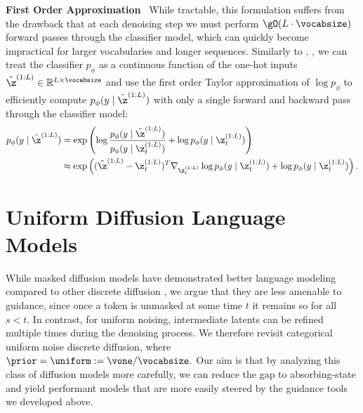 \documentclass{article} %
\begin{document}
\textbf{First Order Approximation}~
While tractable, this formulation suffers from the drawback that at each denoising step we must perform $\gO(L\cdot \vocabsize)$ forward passes through the classifier model, which can quickly become impractical for larger vocabularies and longer sequences.
Similarly to \citet{grathwohl2021oops}, \citet{vignac2022digress}, 
we can treat the classifier $p_\phi$ as a continuous function of the one-hot inputs $\tilde{\z}^{(1:L)} \in \mathbb{R}^{L \times \vocabsize}$ and use the first order Taylor approximation of $\log p_\phi$ to efficiently compute $p_{\phi}(y \mid \tilde{\z}^{(1:L)})$ with only a single forward and backward pass through the classifier model:
\begin{align}\label{eq:cbg_taylor}
    p_\phi(y \mid \tilde{\z}^{(1: L)}) &= \exp\left(\log\frac{p_\phi(y \mid \tilde{\z}^{(1:L)})}{p_\phi(y \mid \z_t^{(1:L)})} + \log p_\phi(y \mid \z_t^{(1:L)})\right) 
    \nonumber \\
    &\approx \exp\left((\tilde{\z}^{(1:L)} - \z_t^{(1:L)})^T\nabla_{\z_t^{(1:L)}}\log p_\phi(y \mid \z_t^{(1:L)}) + \log p_\phi(y \mid \z_t^{(1:L)})\right).
\end{align}

\section{Uniform Diffusion Language Models}\label{sec:method}
While masked diffusion models have demonstrated better language modeling compared to other discrete diffusion \citep{austin2021structured, lou2023discrete}, we argue that they are less amenable to guidance, since 
once a token is unmasked at some time $t$ it remains so for all $s < t$.
In contrast, for uniform noising, intermediate latents can be refined multiple times during the denoising process.
We therefore revisit categorical uniform noise discrete diffusion, where $\prior = \uniform := \vone / \vocabsize.$
Our aim is that by analyzing this class of diffusion models more carefully, we can reduce the gap to absorbing-state and yield performant models that are more easily steered by the guidance tools we developed above.
\end{document}
